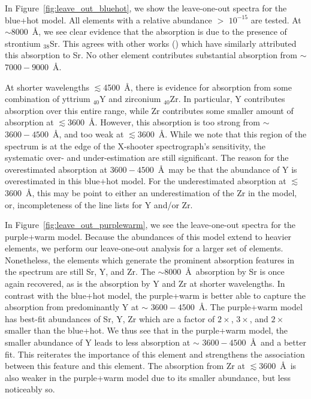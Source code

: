 \documentclass[twocolumn, twocolappendix]{aastex63}
\begin{document}
In Figure~\ref{fig:leave_out_bluehot}, we show the leave-one-out spectra for the blue+hot model. All elements with a relative abundance $>$ $10^{-15}$ are tested. At $\sim$8000~\AA, we see clear evidence that the absorption is due to the presence of strontium ${}_{38}$Sr. This agrees with other works (\citealt{watson19, domoto21, gillanders22}) which have similarly attributed this absorption to Sr. No other element contributes substantial absorption from $\sim$$7000 - 9000$~\AA.

At shorter wavelengths $\lesssim$4500~\AA, there is evidence for absorption from some combination of yttrium ${}_{40}$Y and zirconium ${}_{40}$Zr. In particular, Y contributes absorption over this entire range, while Zr contributes some smaller amount of absorption at $\lesssim$3600~\AA. However, this absorption is too strong from $\sim$ $3600 - 4500$~\AA, and too weak at $\lesssim$3600~\AA. While we note that this region of the spectrum is at the edge of the X-shooter spectrograph's sensitivity, the systematic over- and under-estimation are still significant. The reason for the overestimated absorption at $3600 - 4500$~\AA~may be that the abundance of Y is overestimated in this blue+hot model. For the underestimated absorption at $\lesssim$3600~\AA, this may be point to either an underestimation of the Zr in the model, or, incompleteness of the line lists for Y and/or Zr.

In Figure~\ref{fig:leave_out_purplewarm}, we see the leave-one-out spectra for the purple+warm model. Because the abundances of this model extend to heavier elements, we perform our leave-one-out analysis for a larger set of elements. Nonetheless, the elements which generate the prominent absorption features in the spectrum are still Sr, Y, and Zr. The $\sim$8000~\AA~absorption by Sr is once again recovered, as is the absorption by Y and Zr at shorter wavelengths. In contrast with the blue+hot model, the purple+warm is better able to capture the absorption from predominantly Y at $\sim$ $3600-4500$~\AA. The purple+warm model has best-fit abundances of Sr, Y, Zr which are a factor of $2 \times$, $3 \times$, and $2 \times$ smaller than the blue+hot. We thus see that in the purple+warm model, the smaller abundance of Y leads to less absorption at $\sim$ $3600 - 4500$~\AA~and a better fit. This reiterates the importance of this element and strengthens the association between this feature and this element. The absorption from Zr at $\lesssim 3600$~\AA~is also weaker in the purple+warm model due to its smaller abundance, but less noticeably so. 
\end{document}

